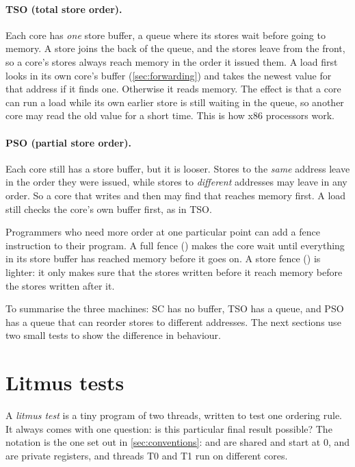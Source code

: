 \paragraph{TSO (total store order).} Each core has \emph{one} store buffer, a queue where its stores wait before going to memory. A store joins the back of the queue, and the stores leave from the front, so a core's stores always reach memory in the order it issued them. A load first looks in its own core's buffer (\cref{sec:forwarding}) and takes the newest value for that address if it finds one. Otherwise it reads memory. The effect is that a core can run a load while its own earlier store is still waiting in the queue, so another core may read the old value for a short time. This is how x86 processors work.

\paragraph{PSO (partial store order).} Each core still has a store buffer, but it is looser. Stores to the \emph{same} address leave in the order they were issued, while stores to \emph{different} addresses may leave in any order. So a core that writes  and then  may find that  reaches memory first. A load still checks the core's own buffer first, as in TSO.

Programmers who need more order at one particular point can add a fence instruction to their program. A full fence () makes the core wait until everything in its store buffer has reached memory before it goes on. A store fence () is lighter: it only makes sure that the stores written before it reach memory before the stores written after it.

To summarise the three machines: SC has no buffer, TSO has a queue, and PSO has a queue that can reorder stores to different addresses. The next sections use two small tests to show the difference in behaviour.

\section{Litmus tests}
\label{sec:notation}

A \emph{litmus test} is a tiny program of two threads, written to test one ordering rule. It always comes with one question: is this particular final result possible? The notation is the one set out in \cref{sec:conventions}:  and  are shared and start at 0,  and  are private registers, and threads T0 and T1 run on different cores.

